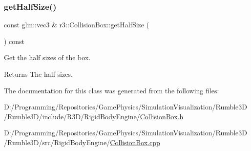 \subsubsection{\texorpdfstring{get\+Half\+Size()}{getHalfSize()}}
{\footnotesize\ttfamily const glm\+::vec3 \& r3\+::\+Collision\+Box\+::get\+Half\+Size (\begin{DoxyParamCaption}{ }\end{DoxyParamCaption}) const}



Get the half sizes of the box. 

\begin{DoxyReturn}{Returns}
The half sizes. 
\end{DoxyReturn}


The documentation for this class was generated from the following files\+:\begin{DoxyCompactItemize}
\item 
D\+:/\+Programming/\+Repositories/\+Game\+Physics/\+Simulation\+Visualization/\+Rumble3\+D/\+Rumble3\+D/include/\+R3\+D/\+Rigid\+Body\+Engine/\mbox{\hyperlink{_collision_box_8h}{Collision\+Box.\+h}}\item 
D\+:/\+Programming/\+Repositories/\+Game\+Physics/\+Simulation\+Visualization/\+Rumble3\+D/\+Rumble3\+D/src/\+Rigid\+Body\+Engine/\mbox{\hyperlink{_collision_box_8cpp}{Collision\+Box.\+cpp}}\end{DoxyCompactItemize}
